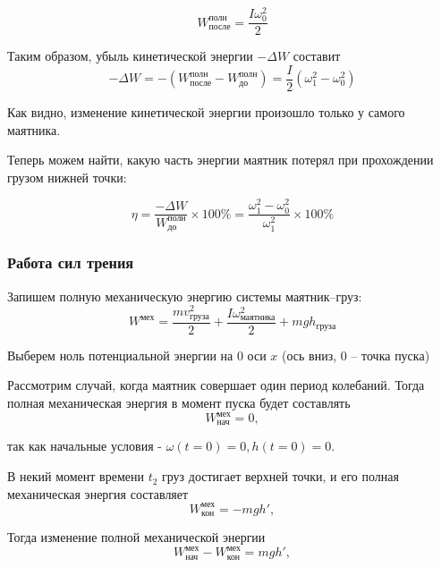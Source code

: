 \documentclass[a4paper,12pt]{article}
\begin{document}
\begin{equation}
	W^\text{полн}_\text{после}=\frac{I\omega_0^2}{2}%
\end{equation}

Таким образом, убыль кинетической энергии $-\Delta W$ составит
\begin{equation}
	-\Delta W=-(W^\text{полн}_\text{после}-W^\text{полн}_\text{до})=\frac{I}{2}(\omega_1^2-\omega_0^2)
\end{equation}

Как видно, изменение кинетической энергии произошло только у самого маятника.

Теперь можем найти, какую часть энергии маятник потерял при прохождении грузом нижней точки:

\begin{equation}
	\eta=\frac{-\Delta W}{W^\text{полн}_\text{до}}\times100\%=
	\frac{\omega_1^2-\omega_0^2}{\omega_1^2}\times100\%
\end{equation}

\subsubsection{Работа сил трения}

Запишем полную механическую энергию системы маятник--груз:
\begin{equation}
	W^\text{мех}=\frac{mv_\text{груза}^2}{2}+\frac{I\omega_\text{маятника}^2}{2}+mgh_\text{груза}
\end{equation}

Выберем ноль потенциальной энергии на $0$ оси $x$ (ось вниз, 0 -- точка пуска)

Рассмотрим случай, когда маятник совершает один период колебаний. Тогда полная механическая энергия в момент пуска будет составлять
\begin{equation}
	W^\text{мех}_\text{нач}=0,
\end{equation}

так как начальные условия - $\omega(t=0)=0, h(t=0)=0$.

В некий момент времени $t_2$ груз достигает верхней точки, и его полная механическая энергия составляет
\begin{equation}
	W^\text{мех}_\text{кон}=-mgh',
\end{equation}

Тогда изменение полной механической энергии
\begin{equation}
	W^\text{мех}_\text{нач}-W^\text{мех}_\text{кон}=mgh',
\end{equation}
\end{document}
